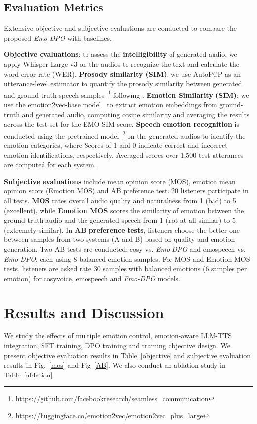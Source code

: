\documentclass[conference]{IEEEtran}
\begin{document}
\subsection{Evaluation Metrics}
\vspace{-0.2cm}
Extensive objective and subjective evaluations are conducted to compare the proposed \textit{Emo-DPO} with baselines.

\textbf{Objective evaluations}: to assess the \textbf{intelligibility} of generated audio, we apply Whisper-Large-v3 on the audios to recognize the text and calculate the word-error-rate (WER).
\textbf{Prosody similarity (SIM)}: we use AutoPCP \cite{seamless2023} as an utterance-level estimator to quantify the prosody similarity between generated and ground-truth speech samples~\footnote{\url{https://github.com/facebookresearch/seamless_communication}} following \cite{wu2024laugh}.
\textbf{Emotion Similarity (SIM)}: we use the emotion2vec-base model~\cite{ma2023emotion2vec} to extract emotion embeddings from ground-truth and generated audio, computing cosine similarity and averaging the results across the test set for the EMO SIM score. \textbf{Speech emotion recognition} is conducted using the pretrained model~\footnote{\url{ https://huggingface.co/emotion2vec/emotion2vec_plus_large}} on the generated audios to identify the emotion categories, where Scores of 1 and 0 indicate correct and incorrect emotion identifications, respectively. Averaged scores over 1,500 test utterances are computed for each system.

\textbf{Subjective evaluations} include mean opinion score (MOS), emotion mean opinion score (Emotion MOS) and AB preference test. 20 listeners participate in all tests. \textbf{MOS} rates overall audio quality and naturalness from 1 (bad) to 5 (excellent), while \textbf{Emotion MOS} scores the similarity of emotion between the ground-truth audio and the generated speech from 1 (not at all similar) to 5 (extremely similar). In \textbf{AB preference tests}, listeners choose the better one between samples from two systems (A and B) based on quality and emotion generation.  Two AB tests are conducted: cosy vs. \textit{Emo-DPO} and emospeech vs. \textit{Emo-DPO}, each using 8 balanced emotion samples. For MOS and Emotion MOS tests, listeners are asked rate 30 samples with balanced emotions (6 samples per emotion) for cosyvoice, emospeech and \textit{Emo-DPO} models.

\vspace{-0.1cm}
\section{Results and Discussion}
\vspace{-0.1cm}
We study the effects of multiple emotion control, emotion-aware LLM-TTS integration, SFT training, DPO training and training objective design. We present objective evaluation results in Table~\ref{objective} and subjective evaluation results in Fig.~\ref{mos} and Fig~\ref{AB}. We also conduct an ablation study in Table~\ref{ablation}.
\end{document}
